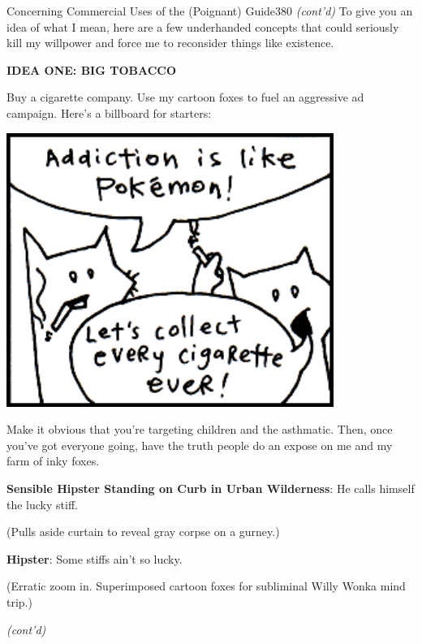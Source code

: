 \documentclass[12pt,twoside]{report}
\begin{document}
	\begin{sidebar}{Concerning Commercial Uses of the (Poignant) Guide}{380}
		\textit{(cont'd) }To give you an idea of what I mean, here are a few underhanded concepts that could seriously kill my willpower and force me to reconsider things like existence.\vspace{6pt}
		
		\textbf{IDEA ONE: BIG TOBACCO}\vspace{6pt}
		
		Buy a cigarette company. Use my cartoon foxes to fuel an aggressive ad campaign. Here's a billboard for starters:\vspace{6pt}
		
		\vspace{6pt}
		\hfill
		\includegraphics[width=0.8\textwidth]{cache/sidebar311.png}
		\hspace*{\fill}
		\vspace{6pt}
		
		Make it obvious that you're targeting children and the asthmatic. Then, once you've got everyone going, have the truth people do an expose on me and my farm of inky foxes.
		
		\begin{quoting}[rightmargin=0pt,leftmargin=0.4\leftmargin,font=itshape]
			\textbf{Sensible Hipster Standing on Curb in Urban Wilderness}: He calls himself the lucky stiff.\vspace{4pt}
			
			{\scriptsize (Pulls aside curtain to reveal gray corpse on a gurney.)}\vspace{4pt}
			
			\textbf{Hipster}: Some stiffs ain't so lucky.\vspace{4pt}
			
			{\scriptsize (Erratic zoom in. Superimposed cartoon foxes for subliminal Willy Wonka mind trip.) }
		\end{quoting}
		
		\textit{(cont'd)} \vspace{6pt}
	\end{sidebar}
\end{document}
